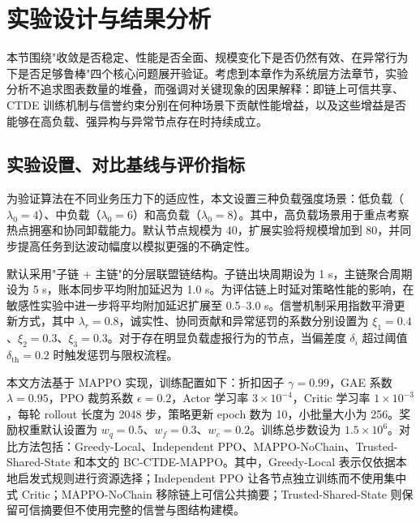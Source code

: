 \section{实验设计与结果分析}

本节围绕"收敛是否稳定、性能是否全面、规模变化下是否仍然有效、在异常行为下是否足够鲁棒"四个核心问题展开验证。考虑到本章作为系统层方法章节，实验分析不追求图表数量的堆叠，而强调对关键现象的因果解释：即链上可信共享、CTDE 训练机制与信誉约束分别在何种场景下贡献性能增益，以及这些增益是否能够在高负载、强异构与异常节点存在时持续成立。

\subsection{实验设置、对比基线与评价指标}

为验证算法在不同业务压力下的适应性，本文设置三种负载强度场景：低负载（$\lambda_0=4$）、中负载（$\lambda_0=6$）和高负载（$\lambda_0=8$）。其中，高负载场景用于重点考察热点拥塞和协同卸载能力。默认节点规模为 40，扩展实验将规模增加到 80，并同步提高任务到达波动幅度以模拟更强的不确定性。

默认采用"子链 + 主链"的分层联盟链结构。子链出块周期设为 1 s，主链聚合周期设为 5 s，账本同步平均附加延迟为 1.0 s。为评估链上时延对策略性能的影响，在敏感性实验中进一步将平均附加延迟扩展至 0.5--3.0 s。信誉机制采用指数平滑更新方式，其中 $\lambda_r=0.8$，诚实性、协同贡献和异常惩罚的系数分别设置为 $\xi_1=0.4$、$\xi_2=0.3$、$\xi_3=0.3$。对于存在明显负载虚报行为的节点，当偏差度 $\delta_i$ 超过阈值 $\delta_{\mathrm{th}}=0.2$ 时触发惩罚与限权流程。

本文方法基于 MAPPO 实现，训练配置如下：折扣因子 $\gamma=0.99$，GAE 系数 $\lambda=0.95$，PPO 裁剪系数 $\epsilon=0.2$，Actor 学习率 $3\times10^{-4}$，Critic 学习率 $1\times10^{-3}$，每轮 rollout 长度为 2048 步，策略更新 epoch 数为 10，小批量大小为 256。奖励权重默认设置为 $w_q=0.5$、$w_f=0.3$、$w_c=0.2$。训练总步数设为 $1.5\times10^6$。对比方法包括：Greedy-Local、Independent PPO、MAPPO-NoChain、Trusted-Shared-State 和本文的 BC-CTDE-MAPPO。其中，Greedy-Local 表示仅依据本地启发式规则进行资源选择；Independent PPO 让各节点独立训练而不使用集中式 Critic；MAPPO-NoChain 移除链上可信公共摘要；Trusted-Shared-State 则保留可信摘要但不使用完整的信誉与图结构建模。

